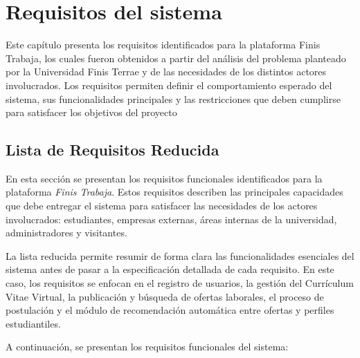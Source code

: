 \documentclass[11pt,a4paper]{Plantilla}
\begin{document}
\section{Requisitos del sistema}%
Este capítulo presenta los requisitos identificados para la plataforma Finis Trabaja, los cuales fueron obtenidos a partir del análisis del problema planteado por la Universidad Finis Terrae y de las necesidades de los distintos actores involucrados. Los requisitos permiten definir el comportamiento esperado del sistema, sus funcionalidades principales y las restricciones que deben cumplirse para satisfacer los objetivos del proyecto

\subsection{Lista de Requisitos Reducida}

En esta sección se presentan los requisitos funcionales identificados para la plataforma \textit{Finis Trabaja}. Estos requisitos describen las principales capacidades que debe entregar el sistema para satisfacer las necesidades de los actores involucrados: estudiantes, empresas externas, áreas internas de la universidad, administradores y visitantes.

\vspace{5pt}

La lista reducida permite resumir de forma clara las funcionalidades esenciales del sistema antes de pasar a la especificación detallada de cada requisito. En este caso, los requisitos se enfocan en el registro de usuarios, la gestión del Currículum Vitae Virtual, la publicación y búsqueda de ofertas laborales, el proceso de postulación y el módulo de recomendación automática entre ofertas y perfiles estudiantiles.

\vspace{5pt}
A continuación, se presentan los requisitos funcionales del sistema:
\end{document}
